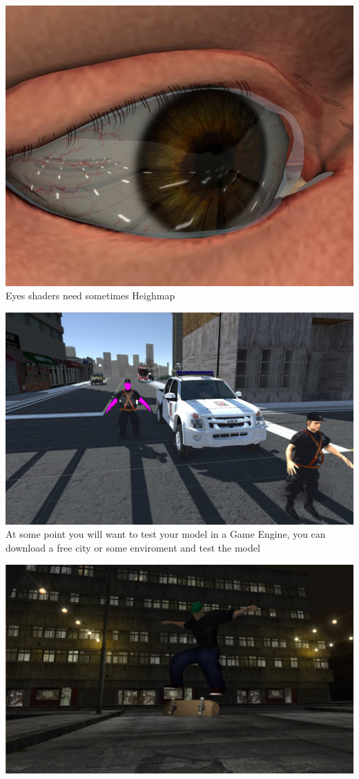 \documentclass{article}
\begin{document}
  \includegraphics[width=\textwidth]{59.jpg}
  Eyes shaders need sometimes Heighmap 

  \includegraphics[width=\textwidth]{58.jpg}
  At some point you will want to test your model in a Game Engine, you can download a free city or some enviroment and test the model

  
  \includegraphics[width=\textwidth]{20.jpg}
\end{document}
